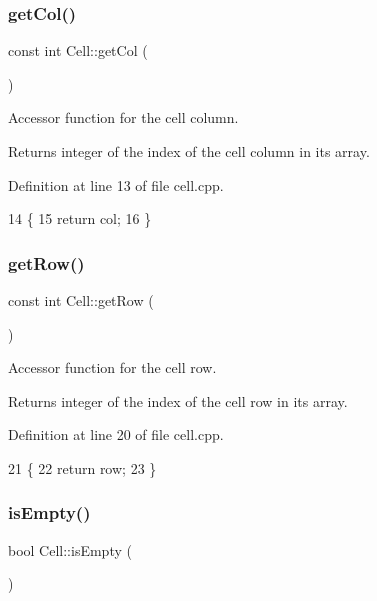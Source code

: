 \subsubsection{\texorpdfstring{get\+Col()}{getCol()}}
{\footnotesize\ttfamily const int Cell\+::get\+Col (\begin{DoxyParamCaption}{ }\end{DoxyParamCaption})}

Accessor function for the cell column. \begin{DoxyReturn}{Returns}
integer of the index of the cell column in its array. 
\end{DoxyReturn}


Definition at line 13 of file cell.\+cpp.


\begin{DoxyCode}
14 \{
15     \textcolor{keywordflow}{return} col;
16 \}
\end{DoxyCode}
\hypertarget{class_cell_a7d9b27ccd514968a69a2b9ee0ad6c612}{}\label{class_cell_a7d9b27ccd514968a69a2b9ee0ad6c612} 
\subsubsection{\texorpdfstring{get\+Row()}{getRow()}}
{\footnotesize\ttfamily const int Cell\+::get\+Row (\begin{DoxyParamCaption}{ }\end{DoxyParamCaption})}

Accessor function for the cell row. \begin{DoxyReturn}{Returns}
integer of the index of the cell row in its array. 
\end{DoxyReturn}


Definition at line 20 of file cell.\+cpp.


\begin{DoxyCode}
21 \{
22     \textcolor{keywordflow}{return} row;
23 \}
\end{DoxyCode}
\hypertarget{class_cell_a6c7344ef2aa917e70364221bf86ff8bc}{}\label{class_cell_a6c7344ef2aa917e70364221bf86ff8bc} 
\subsubsection{\texorpdfstring{is\+Empty()}{isEmpty()}}
{\footnotesize\ttfamily bool Cell\+::is\+Empty (\begin{DoxyParamCaption}{ }\end{DoxyParamCaption})}

